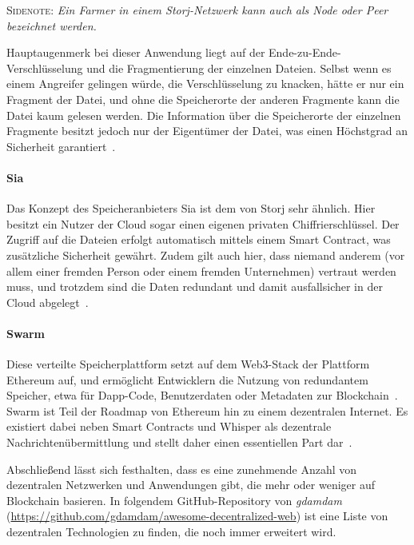 \smallskip

\textsc{Sidenote:}
\textit{
	Ein Farmer in einem Storj-Netzwerk kann auch als Node oder Peer bezeichnet werden. 
}

\smallskip

Hauptaugenmerk bei dieser Anwendung liegt auf der Ende-zu-Ende-Verschlüsselung und die Fragmentierung der einzelnen Dateien. Selbst wenn es einem Angreifer gelingen würde, die Verschlüsselung zu knacken, hätte er nur ein Fragment der Datei, und ohne die Speicherorte der anderen Fragmente kann die Datei kaum gelesen werden. Die Information über die Speicherorte der einzelnen Fragmente besitzt jedoch nur der Eigentümer der Datei, was einen Höchstgrad an Sicherheit garantiert~\cite{Blockchainwelt.2019}.


\paragraph{Sia}

Das Konzept des Speicheranbieters Sia ist dem von Storj sehr ähnlich. Hier besitzt ein Nutzer der Cloud sogar einen eigenen privaten Chiffrierschlüssel. Der Zugriff auf die Dateien erfolgt automatisch mittels einem Smart Contract, was zusätzliche Sicherheit gewährt. Zudem gilt auch hier, dass niemand anderem (vor allem einer fremden Person oder einem fremden Unternehmen) vertraut werden muss, und trotzdem sind die Daten redundant und damit ausfallsicher in der Cloud abgelegt~\cite{Sia.2019}.


\paragraph{Swarm} Diese verteilte Speicherplattform setzt auf dem Web3-Stack der Plattform Ethereum auf, und ermöglicht Entwicklern die Nutzung von redundantem Speicher, etwa für Dapp-Code, Benutzerdaten oder Metadaten zur Blockchain~\cite{Swarm.2019}. Swarm ist Teil der Roadmap von Ethereum hin zu einem dezentralen Internet. Es existiert dabei neben Smart Contracts und Whisper als dezentrale Nachrichtenübermittlung und stellt daher einen essentiellen Part dar~\cite{Gerring.2016}.


\medskip

Abschließend lässt sich festhalten, dass es eine zunehmende Anzahl von dezentralen Netzwerken und Anwendungen gibt, die mehr oder weniger auf Blockchain basieren. In folgendem GitHub-Repository von \textit{gdamdam} (\url{https://github.com/gdamdam/awesome-decentralized-web}) ist eine Liste von dezentralen Technologien zu finden, die noch immer erweitert wird.



